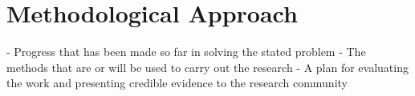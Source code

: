 \chapter{Methodological Approach}

- Progress that has been made so far in solving the stated problem
- The methods that are or will be used to carry out the research
- A plan for evaluating the work and presenting credible evidence to the 
research community